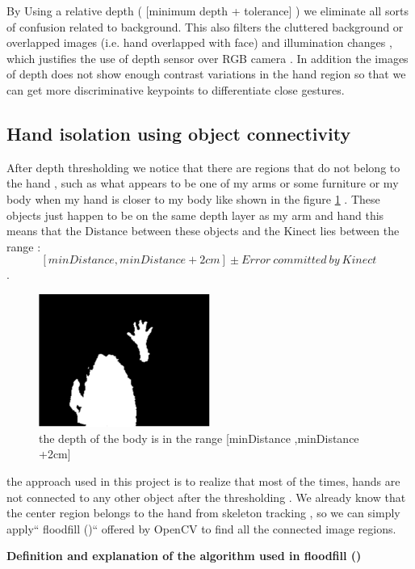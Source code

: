 By Using a relative depth ( [minimum depth + tolerance] ) we eliminate all
sorts of confusion related to background. This also filters the cluttered background or overlapped images (i.e. hand overlapped with face) and illumination changes ,  which justifies the use of depth sensor over RGB camera . In addition  the images of depth does not show enough contrast variations  in the hand region  so that we can get more discriminative keypoints to differentiate close gestures. 


\subsection{Hand isolation using object connectivity }

After depth thresholding we notice that there are regions that do not belong to the hand , such as what appears to be one of my  arms or some furniture or my body when my hand is closer to my body like shown in the figure  \ref{fig:cam10} . These objects just happen to be on the same depth layer as my arm and hand this means that the Distance between these objects and the Kinect lies  between the range : $$[minDistance ,minDistance +2cm] \pm {Error\ committed\ by\ Kinect\ } $$  .


\begin{figure}[H]
\centering
\includegraphics[width=0.5\textwidth]{img/depththresholding.png}
\caption{the depth of the body is in  the range [minDistance ,minDistance +2cm]}
\label{fig:cam10}
\end{figure}

the approach used in this project  is to realize that most of the times, hands are not connected to any other object after the thresholding . We already know that the center region belongs to the hand from skeleton tracking , so we can simply apply`` floodfill ()`` offered by OpenCV to find all the connected image regions.

\textbf{ Definition and explanation of the algorithm used in floodfill () }

